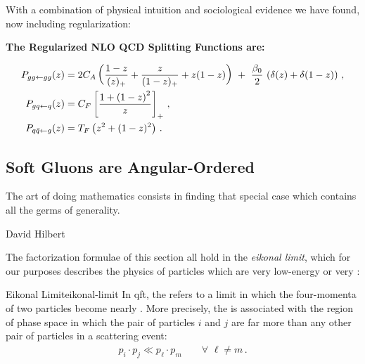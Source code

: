 With a combination of physical intuition and sociological evidence we have found, now including regularization:
\begin{answer}
    \begin{center}
        {\normalfont\Large\bfseries\sffamily The Regularized NLO QCD Splitting Functions are:}
    \end{center}

    \begin{subequations}
    \begin{align}
        \label{eq:p_gtogg}
        P_{gg \leftarrow gg}(z)
        &=
        2C_A \le(
            \frac{1-z}{(z)_+}
            +
            \frac{z}{(1-z)_+}
            +
            z(1-z)
        \ri)
        \,\,
        +
        \,\,
        \frac{\beta_0}{2}
        \,
        \le(\delta(z) + \delta(1-z)\ri)
        \,,
        \\
        \label{eq:p_qtogq}
        P_{gq \leftarrow q}(z)
        &=
        C_F \le[\frac{1+\le(1-z\ri)^2}{z}\ri]_+
        \,,
        \\
        \label{eq:p_gtoqq}
        P_{q\bar{q} \leftarrow g}(z)
        &=
        T_F \left(z^2 + (1-z)^2\right)
        \,.
    \end{align}
    \end{subequations}
\end{answer}




\subsection{Soft Gluons are Angular-Ordered}
\label{sec:soft-gluons}

\epigraph{The art of doing mathematics consists in finding that special case which contains all the germs of generality.}{David Hilbert}

The factorization formulae of this section all hold in the \textit{eikonal limit}, which for our purposes describes the physics of particles which are very low-energy or very :

\begin{definitionbox}{Eikonal Limit}{eikonal-limit}
    In \gls{qft}, the  refers to a limit in which the four-momenta of two particles become nearly .
    More precisely, the  is associated with the region of phase space in which the pair of particles \(i\) and \(j\) are far more  than any other pair of particles in a scattering event:
    \begin{align}
        \label{eq:eikonal-limit}
        p_i \cdot p_j \ll p_\ell \cdot p_m\qquad \forall \,\, \ell\neq m
        \,.
    \end{align}
\end{definitionbox}


